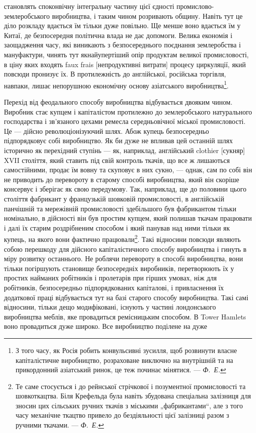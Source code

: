 \parcont{}  %
становлять споконвічну інтегральну частину цієї єдності промислово-землеробського
виробництва, і таким чином розривають
общину. Навіть тут це діло розкладу вдається їм тільки дуже
повільно. Ще менше воно вдається їм у Китаї, де безпосередня
політична влада не дає допомоги. Велика економія і заощадження
часу, які виникають з безпосереднього поєднання землеробства
і мануфактури, чинять тут якнайупертіший опір продуктам
великої промисловості, в ціну яких входять faux frais [непродуктивні
витрати] процесу циркуляції, який повсюди пронизує
їх. В протилежність до англійської, російська торгівля, навпаки,
лишає непорушною економічну основу азіатського виробництва\footnote{
З того часу, як Росія робить конвульсивні зусилля, щоб розвинути
власне капіталістичне виробництво, розраховане виключно на внутрішній та
на прикордонний азіатський ринок, це теж починає мінятися. — \emph{Ф.~Е.}
}.

Перехід від феодального способу виробництва відбувається
двояким чином. Виробник стає купцем і капіталістом протилежно
до землеробського натурального господарства і зв’язаного цехами
ремесла середньовічної міської промисловості. Це — дійсно
революціонізуючий шлях. Абож купець безпосередньо підпорядковує
собі виробництво. Як би дуже не впливав цей останній
шлях історично як перехідний ступінь — як, наприклад, англійський
clothier [сукняр] XVII століття, який ставить під свій контроль
ткачів, що все ж лишаються самостійними, продає їм вовну
та скуповує в них сукно, — однак, сам по собі він не приводить
до перевороту в старому способі виробництва, який він скоріше
консервує і зберігає як свою передумову. Так, наприклад, ще
до половини цього століття фабрикант у французькій шовковій
промисловості, в англійській панчішній та мережівній промисловості
здебільшого був фабрикантом тільки номінально, в дійсності
він був простим купцем, який полишав ткачам працювати
і далі їх старим роздрібненим способом і який панував над ними
тільки як купець, на якого вони фактично працювали\footnote{
Те саме стосується і до рейнської стрічкової і позументної промисловості
та шовкоткацтва. Біля Крефельда була навіть збудована спеціальна залізниця
для зносин цих сільських ручних ткачів з міськими „фабрикантами“, але
з того часу механічне ткацтво привело до бездіяльності цієї залізниці разом
з ручними ткачами. — \emph{Ф.~Е.}
}. Такі
відносини повсюди являють собою перешкоду для дійсного капіталістичного
способу виробництва і гинуть в міру розвитку останнього.
Не роблячи перевороту в способі виробництва, вони тільки
погіршують становище безпосередніх виробників, перетворюють
їх у простих найманих робітників і пролетарів при гірших умовах,
ніж для робітників, безпосередньо підпорядкованих капіталові,
і привласнення їх додаткової праці відбувається тут на базі старого
способу виробництва. Такі самі відносини, тільки дещо модифіковані,
існують у частині лондонського виробництва меблів,
яке провадиться ремісницьким способом. В Tower Hamlets воно
провадиться дуже широко. Все виробництво поділене на дуже
\parbreak{}  %
